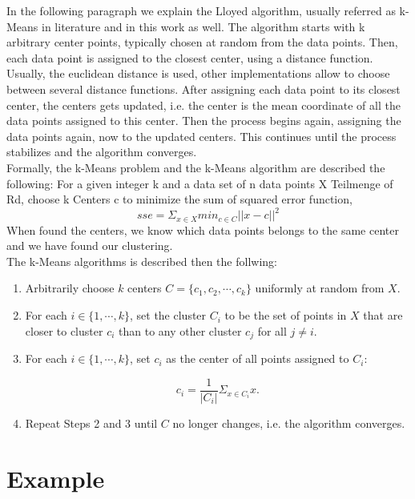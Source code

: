 In the following paragraph we explain the Lloyed algorithm, usually referred as k-Means in literature and in this work as well. The algorithm starts with k arbitrary center points, typically chosen at random from the data points. Then, each data point is assigned to the closest center, using a distance function. Usually, the euclidean distance is used, other implementations allow to choose between several distance functions. After assigning each data point to its closest center, the centers gets updated, i.e. the center is the mean coordinate of all the data points assigned to this center. Then the process begins again, assigning the data points again, now to the updated centers. This continues until the process stabilizes and the algorithm converges.
\\
Formally, the k-Means problem and the k-Means algorithm are described the following: For a given integer k and a data set of n data points X Teilmenge of Rd, choose k Centers c to minimize the sum of squared error function,
\begin{equation*}
sse = \Sigma_{x \in X} min_{c \in C} ||x - c||^2
\end{equation*}
When found the centers, we know which data points belongs to the same center and we have found our clustering.
\\
The k-Means algorithms is described then the follwing:

\begin{enumerate} 
\item Arbitrarily choose $k$ centers $C = \{c_1, c_2, \cdots, c_k\}$ uniformly at random from $X$.
\item For each $i \in \{1, \cdots, k\}$, set the cluster $C_i$ to be the set of points in $X$ that are closer to cluster $c_i$ than to any other cluster $c_j$ for all $j \neq i$.
\item For each $i \in \{1, \cdots, k\}$, set $c_i$ as the center of all points assigned to $C_i$: 

\begin{equation*}
c_i = \frac{1}{|C_i|} \Sigma_{x \in C_i} x.
\end{equation*}

\item Repeat Steps 2 and 3 until $C$ no longer changes, i.e. the algorithm converges.
\end{enumerate}


\section{Example}

